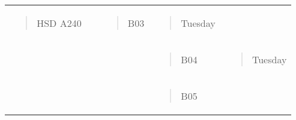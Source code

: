 \begin{longtable}[]{@{}lllll@{}}
\begin{minipage}[t]{0.19\columnwidth}
\begin{quote}
HSD A240
\end{quote}\strut
\end{minipage} & \begin{minipage}[t]{0.19\columnwidth}\raggedright\strut
\strut
\end{minipage} & \begin{minipage}[t]{0.19\columnwidth}\raggedright\strut
\begin{quote}
B03
\end{quote}\strut
\end{minipage} & \begin{minipage}[t]{0.19\columnwidth}\raggedright\strut
\begin{quote}
Tuesday
\end{quote}\strut
\end{minipage}\tabularnewline
\begin{minipage}[t]{0.19\columnwidth}\raggedright\strut
\strut
\end{minipage} & \begin{minipage}[t]{0.19\columnwidth}\raggedright\strut
\strut
\end{minipage} & \begin{minipage}[t]{0.19\columnwidth}\raggedright\strut
\strut
\end{minipage} & \begin{minipage}[t]{0.19\columnwidth}\raggedright\strut
\begin{quote}
B04
\end{quote}\strut
\end{minipage} & \begin{minipage}[t]{0.19\columnwidth}\raggedright\strut
\begin{quote}
Tuesday
\end{quote}\strut
\end{minipage}\tabularnewline
\begin{minipage}[t]{0.19\columnwidth}\raggedright\strut
\strut
\end{minipage} & \begin{minipage}[t]{0.19\columnwidth}\raggedright\strut
\strut
\end{minipage} & \begin{minipage}[t]{0.19\columnwidth}\raggedright\strut
\strut
\end{minipage} & \begin{minipage}[t]{0.19\columnwidth}\raggedright\strut
\begin{quote}
B05
\end{quote}\strut

\end{minipage}
\end{longtable}
